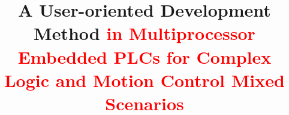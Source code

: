 \documentclass[journal,UTF8]{IEEEtran}
\begin{document}
	\title{A User-oriented Development Method \textcolor{red}{in Multiprocessor Embedded PLCs for Complex Logic and Motion Control Mixed Scenarios}}
	
	
	
	
	
	
	
	
	
\end{document}
